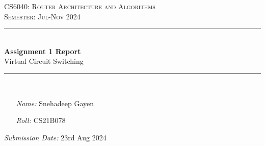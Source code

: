 \thispagestyle{empty} %
\begin{titlepage}
\begin{center}
	\doublespacing %
	\textsc{\huge CS6040: Router Architecture and Algorithms}\\
	\vspace{2.0cm} %
	\onehalfspacing
	\textsc{\Large Semester: Jul-Nov 2024}\\
	\vspace{1.0cm}
	
	\rule{\linewidth}{0.5mm}\\ %
	\vspace{1.4cm}
	\huge \textbf{Assignment 1 Report}\\ %
	\vspace{1cm}
	\large Virtual Circuit Switching\normalsize
	\vspace{0.3cm}
	\rule{\linewidth}{0.5mm}\\
	\vspace{2.4cm}
\end{center}

\onehalfspacing

\begin{minipage}[t]{0.8\textwidth}
	\begin{itemize}
	\item[\emph{Name:}] Snehadeep Gayen
	\item[\emph{Roll:}] CS21B078
	\end{itemize}
\end{minipage}

\vspace{2.9cm}

\flushright \emph{Submission Date:} 23rd Aug 2024
\end{titlepage}
\restoregeometry

\onehalfspacing